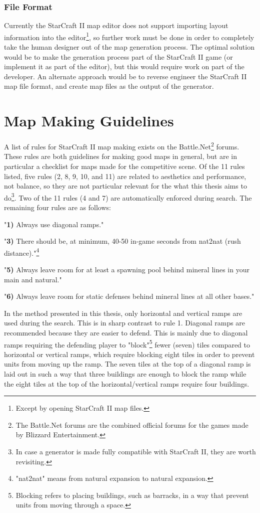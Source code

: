 \subsubsection{File Format}
Currently the StarCraft II map editor does not support importing layout information into the editor\footnote{Except by opening StarCraft II map files.}, so further work must be done in order to completely take the human designer out of the map generation process. The optimal solution would be to make the generation process part of the StarCraft II game (or implement it as part of the editor), but this would require work on part of the developer. An alternate approach would be to reverse engineer the StarCraft II map file format, and create map files as the output of the generator.

\section{Map Making Guidelines}
\label{futurework_guidelines}
A list of rules for StarCraft II map making exists on the Battle.Net\footnote{The Battle.Net forums are the combined official forums for the games made by Blizzard Entertainment.} forums\cite{blizzardrulesmapmaking}. These rules are both guidelines for making good maps in general, but are in particular a checklist for maps made for the competitive scene. Of the 11 rules listed, five rules (2, 8, 9, 10, and 11) are related to aesthetics and performance, not balance, so they are not particular relevant for the what this thesis aims to do\footnote{In case a generator is made fully compatible with StarCraft II, they are worth revisiting.}. Two of the 11 rules (4 and 7) are automatically enforced during search. The remaining four rules are as follows:

\begin{my_itemize}
\item "\textbf{1)} Always use diagonal ramps."
\item "\textbf{3)} There should be, at minimum, 40-50 in-game seconds from nat2nat (rush distance)."\footnote{"nat2nat" means from natural expansion to natural expansion.}
\item "\textbf{5)} Always leave room for at least a spawning pool behind mineral lines in your main and natural."
\item "\textbf{6)} Always leave room for static defenses behind mineral lines at all other bases."
\end{my_itemize}

In the method presented in this thesis, only horizontal and vertical ramps are used during the search. This is in sharp contrast to rule 1. Diagonal ramps are recommended because they are easier to defend. This is mainly due to diagonal ramps requiring the defending player to "block"\footnote{Blocking refers to placing buildings, such as barracks, in a way that prevent units from moving through a space.} fewer (seven) tiles compared to horizontal or vertical ramps, which require blocking eight tiles in order to prevent units from moving up the ramp. The seven tiles at the top of a diagonal ramp is laid out in such a way that three buildings are enough to block the ramp while the eight tiles at the top of the horizontal/vertical ramps require four buildings.

